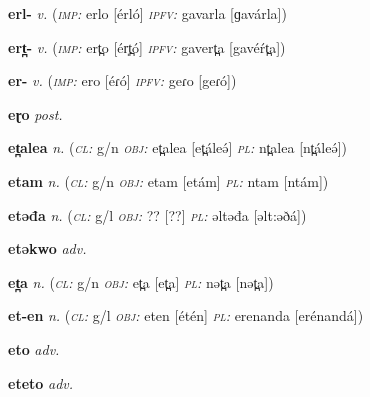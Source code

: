 \newentry
\headword\textbf{erl-}
\ipa{[érl-]}
\synpos\textit{v.} 
\imperative(\textit {\textsc{imp:}} erlo [érló] 
\imperfective\textit{\textsc{ipfv:}} gavarla [ɡavárla])

\newentry
\headword\textbf{ert̪-}
\ipa{[ér̩t̪-]}
\synpos\textit{v.} 
\imperative(\textit {\textsc{imp:}} ert̪o [ér̩t̪ó] 
\imperfective\textit{\textsc{ipfv:}} gavert̪a [gavéŕt̪a])

\newentry
\headword\textbf{er-}
\ipa{[éɾ-]}
\synpos\textit{v.} 
\imperative(\textit {\textsc{imp:}} ero [éɾó] 
\imperfective\textit{\textsc{ipfv:}} geɾo [geɾó])

\newentry
\headword\textbf{eɽo}
\ipa{[éɽo]}
\synpos\textit{post.} 

\newentry
\headword\textbf{et̪alea}  
\ipa{[et̪áleə́]}
\synpos\textit{n.} 
\class(\textit{\textsc{cl:}} {g/n}
\object\textit{\textsc{obj:}} et̪alea [et̪áleə́]
\plural\textit{\textsc{pl:}} nt̪alea [nt̪áleə́])

\newentry
\headword\textbf{etam}  
\ipa{[etám]}
\synpos\textit{n.} 
\class(\textit{\textsc{cl:}} {g/n}
\object\textit{\textsc{obj:}} etam [etám]
\plural\textit{\textsc{pl:}} ntam [ntám])

\newentry
\headword\textbf{etəđa}  
\ipa{[et:əðá]}
\synpos\textit{n.} 
\class(\textit{\textsc{cl:}} {g/l}
\object\textit{\textsc{obj:}} ?? [??]
\plural\textit{\textsc{pl:}} əltəđa [əlt:əðá])

\newentry
\headword\textbf{etəkwo}  
\ipa{[etəkwɔ]}
\synpos\textit{adv.} 

\newentry
\headword\textbf{et̪a}  
\ipa{[et̪a]}
\synpos\textit{n.} 
\class(\textit{\textsc{cl:}} {g/n}
\object\textit{\textsc{obj:}} et̪a [et̪a]
\plural\textit{\textsc{pl:}} nət̪a [nət̪a])

\newentry
\headword\textbf{et-en}  
\ipa{[ét-én]}
\synpos\textit{n.} 
\class(\textit{\textsc{cl:}} {g/l}
\object\textit{\textsc{obj:}} eten [étén]
\plural\textit{\textsc{pl:}} erenanda [erénandá])

\newentry
\headword\textbf{eto}  
\ipa{[eto]}
\synpos\textit{adv.} 

\newentry
\headword\textbf{eteto}  
\ipa{[eteto]}
\synpos\textit{adv.} 

